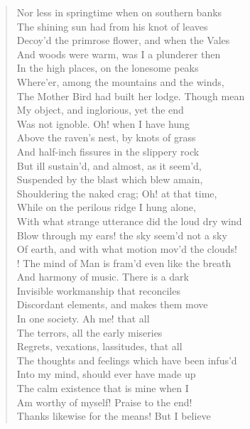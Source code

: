 \begin{verse}
Nor less in springtime when on southern banks  \\
The shining sun had from his knot of leaves  \\
Decoy'd the primrose flower, and when the Vales  \\
And woods were warm, was I a plunderer then  \\
In the high places, on the lonesome peaks	  \\
Where'er, among the mountains and the winds,  \\
The Mother Bird had built her lodge. Though mean  \\
My object, and inglorious, yet the end  \\
Was not ignoble. Oh! when I have hung  \\
Above the raven's nest, by knots of grass	  \\
And half-inch fissures in the slippery rock  \\
But ill sustain'd, and almost, as it seem'd,  \\
Suspended by the blast which blew amain,  \\
Shouldering the naked crag; Oh! at that time,  \\
While on the perilous ridge I hung alone,	  \\
With what strange utterance did the loud dry wind  \\
Blow through my ears! the sky seem'd not a sky  \\
Of earth, and with what motion mov'd the clouds!  \\!
The mind of Man is fram'd even like the breath  \\
And harmony of music. There is a dark	  \\
Invisible workmanship that reconciles  \\
Discordant elements, and makes them move  \\
In one society. Ah me! that all  \\
The terrors, all the early miseries  \\
Regrets, vexations, lassitudes, that all	  \\
The thoughts and feelings which have been infus'd  \\
Into my mind, should ever have made up  \\
The calm existence that is mine when I  \\
Am worthy of myself! Praise to the end!  \\
Thanks likewise for the means! But I believe	  \\

\end{verse}
